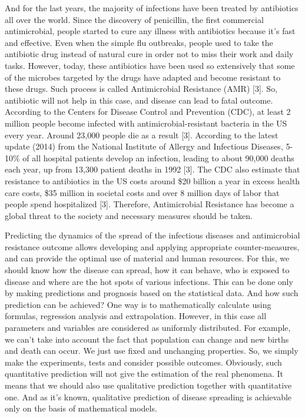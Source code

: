 And for the last years, the majority of infections have been treated by antibiotics all over the world. Since the discovery of penicillin, the first commercial antimicrobial, people started to cure any illness with antibiotics because it's fast and effective. Even when the simple flu outbreaks, people used to take the antibiotic drug instead of natural cure in order not to miss their work and daily tasks. However, today, these antibiotics have been used so extensively that some of the microbes targeted by the drugs have adapted and become resistant to these drugs. Such process is called Antimicrobial Resistance (AMR) [3]. So, antibiotic will not help in this case, and disease can lead to fatal outcome. According to the Centers for Disease Control and Prevention (CDC), at least 2 million people become infected with antimicrobial-resistant bacteria in the US every year. Around 23,000 people die as a result [3]. According to the latest update (2014) from the National Institute of Allergy and Infectious Diseases, 5-10\% of all hospital patients develop an infection, leading to about 90,000 deaths each year, up from 13,300 patient deaths in 1992 [3]. The CDC also estimate that resistance to antibiotics in the US costs around \$20 billion a year in excess health care costs, \$35 million in societal costs and over 8 million days of labor that people spend hospitalized [3]. Therefore, Antimicrobial Resistance has become a global threat to the society and necessary measures should be taken.

Predicting the dynamics of the spread of the infectious diseases and antimicrobial resistance outcome allows developing and applying appropriate counter-measures, and can provide the optimal use of material and human resources.  For this, we should know how the disease can spread, how it can behave, who is exposed to disease and where are the hot spots of various infections. This can be done only by making predictions and prognosis based on the statistical data. And how such prediction can be achieved? One way is to mathematically calculate using formulas, regression analysis and extrapolation. However, in this case all parameters and variables are considered as uniformly distributed. For example, we can't take into account the fact that population can change and new births and death can occur. We just use fixed and unchanging properties. So, we simply make the experiments, tests and consider possible outcomes. Obviously, such quantitative prediction will not give the estimation of the real phenomena. It means that we should also use qualitative prediction together with quantitative one. And as it's known, qualitative prediction of disease spreading is achievable only on the basis of mathematical models.

